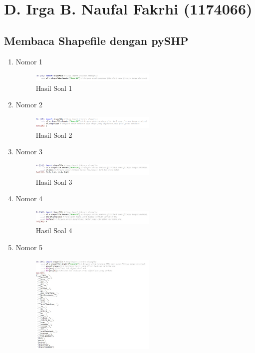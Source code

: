 \section{D. Irga B. Naufal Fakrhi (1174066)}
\subsection{Membaca Shapefile dengan pySHP}
\begin{enumerate}
	\item Nomor 1
	
	\begin{figure}[H]
		\includegraphics[width=6cm]{figures/Tugas3/1174066/Soal1.jpg}
		\centering
		\caption{Hasil Soal 1}
	\end{figure}
	\item Nomor 2
	
	\begin{figure}[H]
		\includegraphics[width=6cm]{figures/Tugas3/1174066/Soal2.png}
		\centering
		\caption{Hasil Soal 2}
	\end{figure}
	\item Nomor 3
	
	\begin{figure}[H]
		\includegraphics[width=6cm]{figures/Tugas3/1174066/Soal3.jpg}
		\centering
		\caption{Hasil Soal 3}
	\end{figure}
	\item Nomor 4
	
	\begin{figure}[H]
		\includegraphics[width=6cm]{figures/Tugas3/1174066/Soal4.jpg}
		\centering
		\caption{Hasil Soal 4}
	\end{figure}
	\item Nomor 5
	
	\begin{figure}[H]
		\includegraphics[width=6cm]{figures/Tugas3/1174066/Soal5.jpg}

\end{figure}
\end{enumerate}
